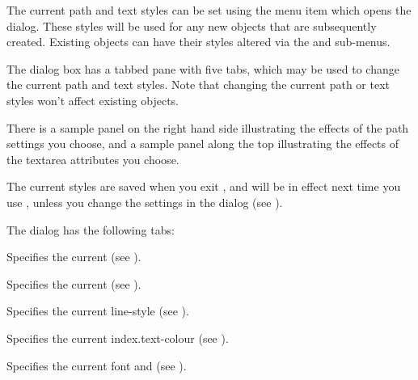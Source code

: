 
The current path and text styles can be set using the
 menu item which opens the 
dialog. These styles will be used for any new \glspl{object} that
are subsequently created. Existing \glspl{object} can have their
styles altered via the  and 
sub-menus. 


The  dialog box has a tabbed pane with five tabs,
which may be used to change the current path and text styles.
Note that changing the current path or text styles won't affect
existing \glspl{object}. 

There is a sample panel on the right hand side illustrating the
effects of the \gls{path} settings you choose, and a sample panel along
the top illustrating the effects of the \gls*{textarea} attributes
you choose.

The current styles are saved when you exit \FlowframTk, and will be in
effect next time you use \FlowframTk, unless you change the 
 settings in the  dialog
(see ).

The  dialog has the following tabs:
\begin{deflist}
\begin{itemdesc}
Specifies the current  (see
).
\end{itemdesc}

\begin{itemdesc}
Specifies the current  (see
).
\end{itemdesc}

\begin{itemdesc}
Specifies the current \gls{line-style} (see
).
\end{itemdesc}

\begin{itemdesc}
Specifies the current \gls{index.text-colour} (see
).
\end{itemdesc}

\begin{itemdesc}
Specifies the current \gls{font} and  (see
).
\end{itemdesc}

\end{deflist}

